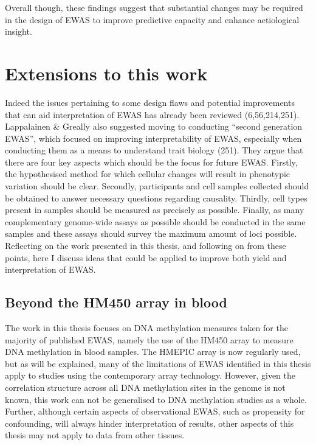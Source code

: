 \documentclass[11pt,twoside]{bristolthesis}
\begin{document}
Overall though, these findings suggest that substantial changes may be required in the design of EWAS to improve predictive capacity and enhance aetiological insight.

\hypertarget{extensions-to-work}{%
\section{Extensions to this work}\label{extensions-to-work}}

Indeed the issues pertaining to some design flaws and potential improvements that can aid interpretation of EWAS has already been reviewed (6,56,214,251). Lappalainen \& Greally also suggested moving to conducting ``second generation EWAS'', which focused on improving interpretability of EWAS, especially when conducting them as a means to understand trait biology (251). They argue that there are four key aspects which should be the focus for future EWAS. Firstly, the hypothesised method for which cellular changes will result in phenotypic variation should be clear. Secondly, participants and cell samples collected should be obtained to answer necessary questions regarding causality. Thirdly, cell types present in samples should be measured as precisely as possible. Finally, as many complementary genome-wide assays as possible should be conducted in the same samples and these assays should survey the maximum amount of loci possible. Reflecting on the work presented in this thesis, and following on from these points, here I discuss ideas that could be applied to improve both yield and interpretation of EWAS.

\hypertarget{beyond-the-hm450}{%
\subsection{Beyond the HM450 array in blood}\label{beyond-the-hm450}}

The work in this thesis focuses on DNA methylation measures taken for the majority of published EWAS, namely the use of the HM450 array to measure DNA methylation in blood samples. The HMEPIC array is now regularly used, but as will be explained, many of the limitations of EWAS identified in this thesis apply to studies using the contemporary array technology. However, given the correlation structure across all DNA methylation sites in the genome is not known, this work can not be generalised to DNA methylation studies as a whole. Further, although certain aspects of observational EWAS, such as propensity for confounding, will always hinder interpretation of results, other aspects of this thesis may not apply to data from other tissues.
\end{document}
